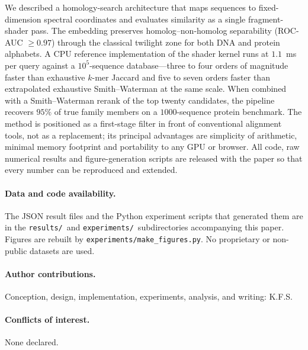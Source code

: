 \documentclass[twocolumn,11pt,a4paper]{article}
\theoremstyle{definition}
\theoremstyle{remark}
\begin{document}
We described a homology-search architecture that maps sequences to
fixed-dimension spectral coordinates and evaluates similarity as a single
fragment-shader pass. The embedding preserves homolog--non-homolog
separability (ROC-AUC $\geq 0.97$) through the classical twilight zone for
both DNA and protein alphabets. A CPU reference implementation of the
shader kernel runs at $1.1$~ms per query against a $10^5$-sequence
database---three to four orders of magnitude faster than exhaustive $k$-mer
Jaccard and five to seven orders faster than extrapolated exhaustive
Smith--Waterman at the same scale. When combined with a Smith--Waterman
rerank of the top twenty candidates, the pipeline recovers $95\%$ of true
family members on a $1000$-sequence protein benchmark. The method is
positioned as a first-stage filter in front of conventional alignment
tools, not as a replacement; its principal advantages are simplicity of
arithmetic, minimal memory footprint and portability to any GPU or
browser. All code, raw numerical results and figure-generation scripts
are released with the paper so that every number can be reproduced and
extended.

\paragraph{Data and code availability.} The JSON result files and the
Python experiment scripts that generated them are in the
\texttt{results/}\ and \texttt{experiments/}\ subdirectories accompanying
this paper. Figures are rebuilt by
\texttt{experiments/make\_figures.py}. No proprietary or non-public
datasets are used.

\paragraph{Author contributions.} Conception, design, implementation,
experiments, analysis, and writing: K.F.S.

\paragraph{Conflicts of interest.} None declared.



\end{document}
